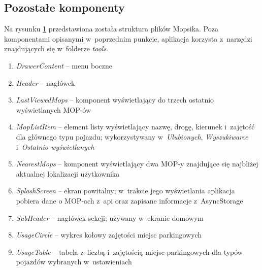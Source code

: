 \subsection{Pozostałe komponenty}
Na rysunku \ref{mopsik_mobile_structure} przedstawiona została struktura plików Mopsika. Poza komponentami opisanymi w~poprzednim punkcie, aplikacja korzysta z~narzędzi znajdujących się w~folderze \textit{tools}.
\begin{enumerate}
\item \textit{DrawerContent} -- menu boczne
\item \textit{Header} -- nagłówek
\item \textit{LastViewedMops} -- komponent wyświetlający do trzech ostatnio wyświetlanych MOP-ów
\item \textit{MopListItem} -- element listy wyświetlający nazwę, drogę, kierunek i~zajętość dla głównego typu pojazdu; wykorzystywany w~\textit{Ulubionych}, \textit{Wyszukiwarce} i~\textit{Ostatnio wyświetlanych}
\item \textit{NearestMops} -- komponent wyświetlający dwa MOP-y znajdujące się najbliżej aktualnej lokalizacji użytkownika
\item \textit{SplashScreen} -- ekran powitalny; w~trakcie jego wyświetlania aplikacja pobiera dane o MOP-ach z~api oraz zapisane informacje z~AsyncStorage
\item \textit{SubHeader} -- nagłówek sekcji; używany w~ekranie domowym
\item \textit{UsageCircle} -- wykres kołowy zajętości miejsc parkingowych
\item \textit{UsageTable} -- tabela z~liczbą i~zajętością miejsc parkingowych dla typów pojazdów wybranych w~ustawieniach
\end{enumerate}
\begin{figure}[!htb]
\label{mopsik_mobile_structure}
\end{figure}



